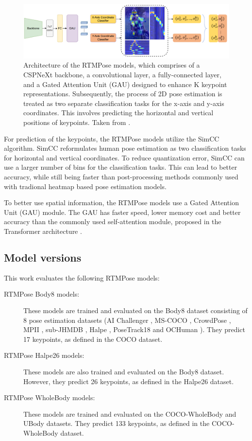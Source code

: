 \begin{figure}[htbp]
    \centering
    \includegraphics[width=\textwidth]{obrazky-figures/rtmpose_architecture.png}
    \caption{Architecture of the RTMPose models, which comprises of a CSPNeXt backbone, a convolutional layer, a fully-connected layer, and a Gated Attention Unit (GAU) designed to enhance K keypoint representations. Subsequently, the process of 2D pose estimation is treated as two separate classification tasks for the x-axis and y-axis coordinates. This involves predicting the horizontal and vertical positions of keypoints. Taken from \cite{rtmpose}.}
    \label{fig:rtmpose_architecture}
\end{figure}

For prediction of the keypoints, the RTMPose models utilize the SimCC \cite{simcc} algorithm. SimCC reformulates human pose estimation as two classification tasks for horizontal and vertical coordinates. To reduce quantization error, SimCC can use a larger number of bins for the classification tasks. This can lead to better accuracy, while still being faster than post-processing methods commonly used with tradional heatmap based pose estimation models.

To better use spatial information, the RTMPose models use a Gated Attention Unit (GAU) \cite{gau} module. The GAU has faster speed, lower memory cost and better accuracy than the commonly used self-attention module, proposed in the Transformer architecture \cite{attentionIsAllYouNeed}.

\subsection{Model versions}
This work evaluates the following RTMPose models:

\begin{description}
    \item[RTMPose Body8 models:] These models are trained and evaluated on the Body8 dataset consisting of 8 pose estimation datasets (AI Challenger \cite{ai_challenger}, MS-COCO \cite{coco}, CrowdPose \cite{crowdpose}, MPII \cite{mpii}, sub-JHMDB \cite{JHMDB}, Halpe \cite{halpe}, PoseTrack18 \cite{posetrack} and OCHuman \cite{ochuman}). They predict 17 keypoints, as defined in the COCO dataset.
    \item[RTMPose Halpe26 models:] These models are also trained and evaluated on the Body8 dataset. However, they predict 26 keypoints, as defined in the Halpe26 dataset.
    \item[RTMPose WholeBody models:] These models are trained and evaluated on the COCO-WholeBody \cite{coco-wholebody} and UBody \cite{ubody} datasets. They predict 133 keypoints, as defined in the COCO-WholeBody dataset.
\end{description}




